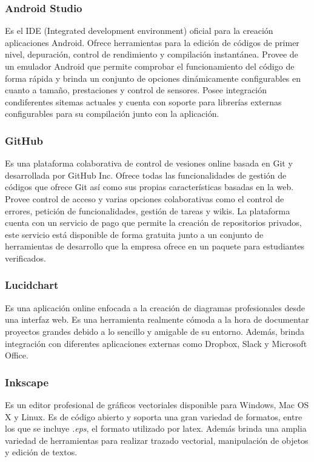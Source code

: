 \documentclass[12pt]{article}
\begin{document}
        \subsubsection{Android Studio}
            Es el IDE (Integrated development environment) oficial para la creación aplicaciones Android. Ofrece herramientas para la edición de códigos de primer nivel, depuración, control de rendimiento y compilación instantánea. Provee de un emulador Android que permite comprobar el funcionamiento del código de forma rápida y brinda un conjunto de opciones dinámicamente configurables en cuanto a tamaño, prestaciones y control de sensores. Posee integración condiferentes sitemas actuales y cuenta con soporte para librerías externas configurables para su compilación junto con la aplicación.

        \subsubsection{GitHub}
            Es una plataforma colaborativa de control de vesiones online basada en Git y desarrollada por GitHub Inc. Ofrece todas las funcionalidades de gestión de códigos que ofrece Git así como sus propias características basadas en la web. Provee control de acceso y varias opciones colaborativas como el control de errores, petición de funcionalidades, gestión de tareas y wikis. La plataforma cuenta con un servicio de pago que permite la creación de repositorios privados, este servicio está disponible de forma gratuita junto a un conjunto de herramientas de desarrollo que la empresa ofrece en un paquete para estudiantes verificados.

        \subsubsection{Lucidchart}
            Es una aplicación online enfocada a la creación de diagramas profesionales desde una interfaz web. Es una herramienta realmente cómoda a la hora de documentar proyectos grandes debido a lo sencillo y amigable de su entorno. Además, brinda integración con diferentes aplicaciones externas como Dropbox, Slack y Microsoft Office. 

        \subsubsection{Inkscape}
            Es un editor profesional de gráficos vectoriales disponible para Windows, Mac OS X y Linux. Es de código abierto y soporta una gran variedad de formatos, entre los que se incluye \textit{.eps}, el formato utilizado por latex. Además brinda una amplia variedad de herramientas para realizar trazado vectorial, manipulación de objetos y edición de textos.
\end{document}
